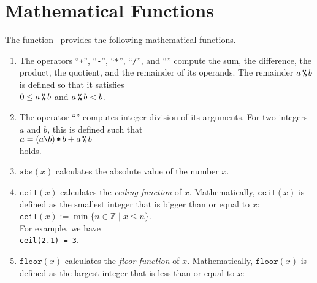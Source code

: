 \section{Mathematical Functions}
The function \setlx\ provides the following mathematical functions.
\begin{enumerate}
\item The operators 
      ``\texttt{+}'',
      ``\texttt{-}'',
      ``\texttt{*}'',
      ``\texttt{/}'', and
      ``\texttt{}'' compute the sum, the difference, the product, the quotient,
      and the remainder of its operands.  The remainder $a\, \texttt{\symbol{37}}\, b$ is
      defined so that it satisfies
      \\[0.2cm]
      \hspace*{1.3cm}
      $0 \leq a \,\texttt{\symbol{37}}\, b$ \quad and \quad $a \,\texttt{\symbol{37}}\, b < b$.
\item The operator ``\texttt{}'' computes integer division of its arguments.
      For two integers $a$ and $b$, this is defined such that 
      \\[0.2cm]
      \hspace*{1.3cm}
      $a = (a\texttt{\symbol{92}} b) \,\texttt{*}\, b + a \,\texttt{\symbol{37}}\, b$
      \\[0.2cm]
      holds.
\item $\texttt{abs}(x)$ calculates the absolute value of the number $x$.
\item $\texttt{ceil}(x)$ calculates the
      \href{https://en.wikipedia.org/wiki/Floor_and_ceiling_functions}{\emph{ceiling function}} of $x$.
      Mathematically, 
      $\mathtt{ceil}(x)$ is defined as the smallest integer that is bigger than or equal
      to $x$:
      \\[0.2cm]
      \hspace*{1.3cm}
      $\texttt{ceil}(x) := \min \{ n \in \mathbb{Z} \mid x \leq n \}$.
      \\[0.2cm]
      For example, we have
      \\[0.2cm]
      \hspace*{1.3cm}
      \texttt{ceil(2.1) = 3}.
\item $\texttt{floor}(x)$ calculates the
      \href{https://en.wikipedia.org/wiki/Floor_and_ceiling_functions}{\emph{floor function}}  of $x$.
      Mathematically, $\mathtt{floor}(x)$ is defined as the largest integer that is less than or equal
      to $x$:
      \\[0.2cm]
      \hspace*{1.3cm}

\end{enumerate}
